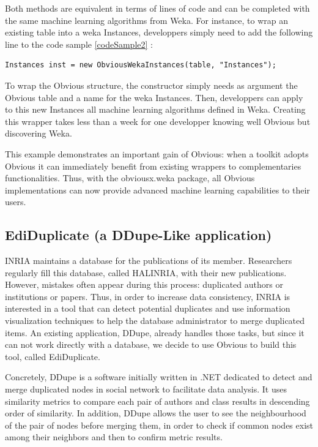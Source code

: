 Both methods are equivalent in terms of lines of code and can be completed with the same machine learning algorithms from Weka. For instance, to wrap an existing table into a weka Instances, developpers simply need to add the following line to the code sample \ref{codeSample2} :

\begin{lstlisting}
Instances inst = new ObviousWekaInstances(table, "Instances");
\end{lstlisting}

To wrap the Obvious structure, the constructor simply needs as argument the Obvious table and a name for the weka Instances. Then, developpers can apply to this new Instances all machine learning algorithms defined in Weka. Creating this wrapper takes less than a week for one developper knowing well Obvious but discovering Weka.

This example demonstrates an important gain of Obvious: when a toolkit adopts Obvious it can immediately benefit from existing wrappers to complementaries functionalities. Thus, with the obviousx.weka package, all Obvious implementations can now provide advanced machine learning capabilities to their users.

\subsection{EdiDuplicate (a DDupe-Like application)}

INRIA maintains a database for the publications of its member. Researchers regularly fill this database, called HALINRIA, with their new publications. However, mistakes often appear during this process: duplicated authors or institutions or papers. Thus, in order to increase data consistency, INRIA is interested in a tool that can detect potential duplicates and use information visualization techniques to help the database administrator to merge duplicated items. An existing application, DDupe, already handles those tasks, but since it can not work directly with a database, we decide to use Obvious to build this tool, called EdiDuplicate.

Concretely, DDupe is a software initially written in .NET dedicated to detect and merge duplicated nodes  in social network to facilitate data analysis. It uses similarity metrics to compare each pair  of authors and class results in descending order of similarity. In addition, DDupe allows the user to see the neighbourhood of the pair of nodes before merging them, in order to check if common nodes exist among their neighbors and then to confirm metric results.

